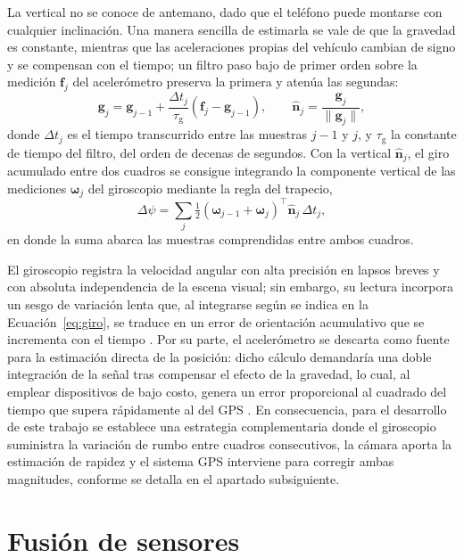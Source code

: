 La vertical no se conoce de antemano, dado que el teléfono puede montarse con cualquier inclinación.
Una manera sencilla de estimarla se vale de que la gravedad es constante, mientras que las aceleraciones propias del vehículo cambian de signo y se compensan con el tiempo; un filtro paso bajo de primer orden sobre la medición $\mathbf{f}_j$ del acelerómetro preserva la primera y atenúa las segundas:
\begin{equation}
\mathbf{g}_j = \mathbf{g}_{j-1} + \frac{\Delta t_j}{\tau_{\mathrm{g}}}\left(\mathbf{f}_j - \mathbf{g}_{j-1}\right),
\qquad
\hat{\mathbf{n}}_j = \frac{\mathbf{g}_j}{\|\mathbf{g}_j\|},
\label{eq:vertical}
\end{equation}
donde $\Delta t_j$ es el tiempo transcurrido entre las muestras $j-1$ y $j$, y $\tau_{\mathrm{g}}$ la constante de tiempo del filtro, del orden de decenas de segundos.
Con la vertical $\hat{\mathbf{n}}_j$, el giro acumulado entre dos cuadros se consigue integrando la componente vertical de las mediciones $\boldsymbol{\omega}_j$ del giroscopio mediante la regla del trapecio,
\begin{equation}
\Delta\psi = \sum_{j} \tfrac{1}{2}\left(\boldsymbol{\omega}_{j-1} + \boldsymbol{\omega}_{j}\right)^{\top}\hat{\mathbf{n}}_j\,\Delta t_j,
\label{eq:giro}
\end{equation}
en donde la suma abarca las muestras comprendidas entre ambos cuadros.

El giroscopio registra la velocidad angular con alta precisión en lapsos breves y con absoluta independencia de la escena visual; sin embargo, su lectura incorpora un sesgo de variación lenta que, al integrarse según se indica en la Ecuación~\eqref{eq:giro}, se traduce en un error de orientación acumulativo que se incrementa con el tiempo \cite{groves2013gnss}.
Por su parte, el acelerómetro se descarta como fuente para la estimación directa de la posición: dicho cálculo demandaría una doble integración de la señal tras compensar el efecto de la gravedad, lo cual, al emplear dispositivos de bajo costo, genera un error proporcional al cuadrado del tiempo que supera rápidamente al del GPS \cite{groves2013gnss}.
En consecuencia, para el desarrollo de este trabajo se establece una estrategia complementaria donde el giroscopio suministra la variación de rumbo entre cuadros consecutivos, la cámara aporta la estimación de rapidez y el sistema GPS interviene para corregir ambas magnitudes, conforme se detalla en el apartado subsiguiente.

\section{Fusión de sensores}
\label{sec:fusion}

